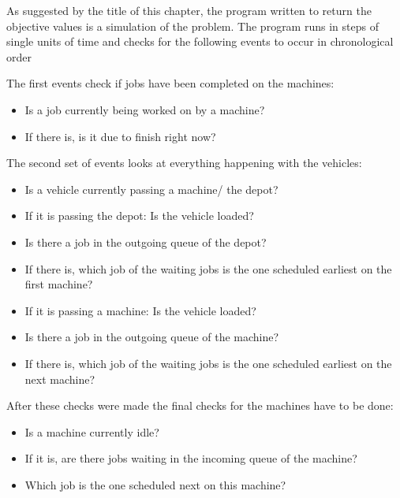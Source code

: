 As suggested by the title of this chapter, the program written to return the objective values is a simulation of the problem. The program runs in
steps of single units of time and checks for the following events to occur in chronological order

The first events check if jobs have been completed on the machines:

\begin{itemize}
\item Is a job currently being worked on by a machine?

\item If there is, is it due to finish right now?
\end{itemize}

The second set of events looks at everything happening with the vehicles:

\begin{itemize}
\item Is a vehicle currently passing a machine/ the depot?

\item If it is passing the depot: Is the vehicle loaded?

\item Is there a job in the outgoing queue of the depot?

\item If there is, which job of the waiting jobs is the one scheduled earliest on the first machine?

\item If it is passing a machine: Is the vehicle loaded?

\item Is there a job in the outgoing queue of the machine?

\item If there is, which job of the waiting jobs is the one scheduled earliest on the next machine?
\end{itemize}

After these checks were made the final checks for the machines have to be done:

\begin{itemize}
\item Is a machine currently idle?

\item If it is, are there jobs waiting in the incoming queue of the machine?

\item Which job is the one scheduled next on this machine?
\end{itemize}
